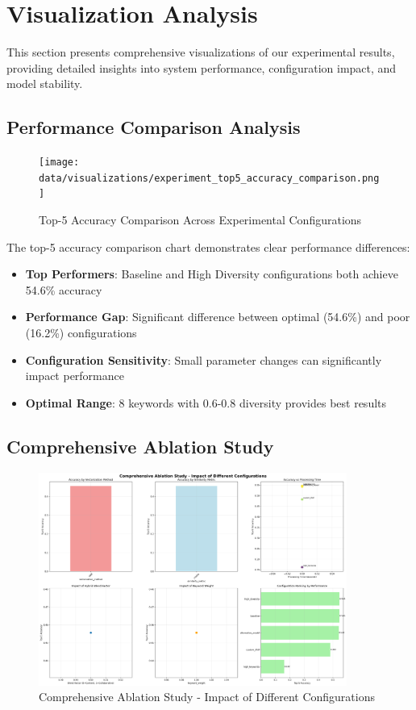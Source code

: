 \documentclass[12pt,a4paper]{article}
\begin{document}
\section{Visualization Analysis}

This section presents comprehensive visualizations of our experimental results, providing detailed insights into system performance, configuration impact, and model stability.

\subsection{Performance Comparison Analysis}
\begin{figure}[H]
    \centering
    \texttt{[image: data/visualizations/experiment\_top5\_accuracy\_comparison.png]}
    \caption{Top-5 Accuracy Comparison Across Experimental Configurations}
    \label{fig:accuracy_comparison}
\end{figure}

The top-5 accuracy comparison chart demonstrates clear performance differences:
\begin{itemize}
    \item \textbf{Top Performers}: Baseline and High Diversity configurations both achieve 54.6\% accuracy
    \item \textbf{Performance Gap}: Significant difference between optimal (54.6\%) and poor (16.2\%) configurations
    \item \textbf{Configuration Sensitivity}: Small parameter changes can significantly impact performance
    \item \textbf{Optimal Range}: 8 keywords with 0.6-0.8 diversity provides best results
\end{itemize}

\subsection{Comprehensive Ablation Study}
\begin{figure}[H]
    \centering
    \includegraphics[width=0.9\textwidth]{data/visualizations/comprehensive_ablation_study.png}
    \caption{Comprehensive Ablation Study - Impact of Different Configurations}
    \label{fig:ablation_study}
\end{figure}
\end{document}
